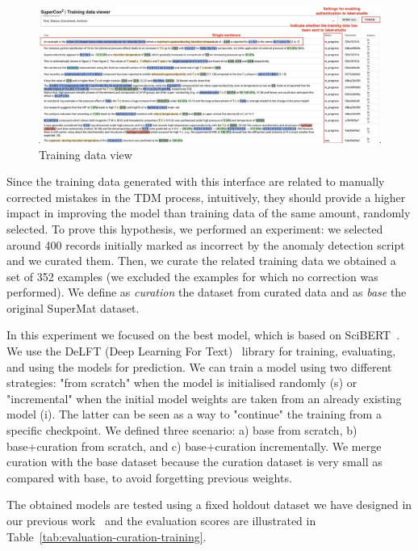 \documentclass[a4paper]{article}
\begin{document}
\begin{figure}[ht]
  \centering
  \includegraphics[width=1\textwidth]{images/training-data-viewer} 
  \caption{Training data view}
  \label{fig:training-data-view}
\end{figure}

Since the training data generated with this interface are related to manually corrected mistakes in the TDM process, intuitively, they should provide a higher impact in improving the model than training data of the same amount, randomly selected.
To prove this hypothesis, we performed an experiment: we selected around 400 records initially marked as incorrect by the anomaly detection script and we curated them. 
Then, we curate the related training data we obtained a set of 352 examples (we excluded the examples for which no correction was performed). 
We define as \textit{curation} the dataset from curated data and as \textit{base} the original SuperMat dataset.

In this experiment we focused on the best model, which is based on SciBERT~\cite{Beltagy2019SciBERT}. 
We use the DeLFT (Deep Learning For Text)~\cite{DeLFT} library for training, evaluating, and using the models for prediction. 
We can train a model using two different strategies: "from scratch" when the model is initialised randomly (s) or "incremental" when the initial model weights are taken from an already existing model (i).
The latter can be seen as a way to "continue" the training from a specific checkpoint. 
We defined three scenario: a) base from scratch, b) base+curation from scratch, and c) base+curation incrementally. 
We merge curation with the base dataset because the curation dataset is very small as compared with base, to avoid forgetting previous weights.  

The obtained models are tested using a fixed holdout dataset we have designed in our previous work~\cite{lfoppiano2023automatic} and the evaluation scores are illustrated in Table~\ref{tab:evaluation-curation-training}.
\end{document}

